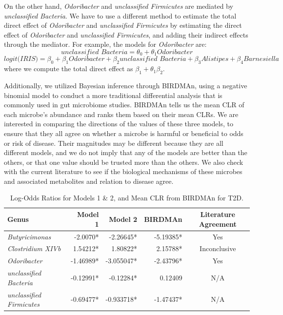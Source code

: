 \documentclass[12pt,letterpaper]{article}
\begin{document}
On the other hand, \textit{Odoribacter} and \textit{unclassified Firmicutes} are mediated by \textit{unclassified Bacteria}. We have to use a different method to estimate the total direct effect of \textit{Odoribacter} and \textit{unclassified Firmicutes} by estimating the direct effect of \textit{Odoribacter} and \textit{unclassified Firmicutes}, and adding their indirect effects through the mediator. For example, the models for \textit{Odoribacter} are:
\[\textit{unclassified Bacteria} = \theta_0 + \theta_1 \textit{Odoribacter}\]
\[\textit{logit(IRIS)} = \beta_0 + \beta_1 \textit{Odoribacter} + \beta_2 \textit{unclassified Bacteria} + \beta_3 \textit{Alistipes} + \beta_4 \textit{Barnesiella}\]
where we compute the total direct effect as $\beta_1 + \theta_1\beta_2$. 

Additionally, we utilized Bayesian inference through BIRDMAn, using a negative binomial model to conduct a more traditional differential analysis that is commonly used in gut microbiome studies. BIRDMAn tells us the mean CLR of each microbe’s abundance and ranks them based on their mean CLRs. We are interested in comparing the directions of the values of these three models, to ensure that they all agree on whether a microbe is harmful or beneficial to odds or risk of disease. Their magnitudes may be different because they are all different models, and we do not imply that any of the models are better than the others, or that one value should be trusted more than the others. We also check with the current literature to see if the biological mechanisms of these microbes and associated metabolites and relation to disease agree. 

\begin{table}
        
        \centering
        \begin{tabular}{l r r r c}
          \toprule
          \textbf{Genus} & \textbf{Model 1} & \textbf{Model 2} & \textbf{BIRDMAn} & \textbf{Literature Agreement} \\
          \midrule
          \textit{Butyricimonas} & -2.0070* & -2.26645* & -5.19385* & Yes \\
          \textit{Clostridium XIVb} & 1.54212* & 1.80822* & 2.15788* & Inconclusive \\
          \textit{Odoribacter} & -1.46989* & -3.055047* & -2.43796* & Yes \\
          \textit{unclassified Bacteria} & -0.12991* & -0.12284* & 0.12409 & N/A \\
          \textit{unclassified Firmicutes} & -0.69477* & -0.933718* & -1.47437* & N/A \\
          \bottomrule
        \end{tabular}
        \caption{Log-Odds Ratios for Models 1 \& 2, and Mean CLR from BIRDMAn for T2D.}
        \label{table:t2dresults}
      \end{table}
      
\end{document}
